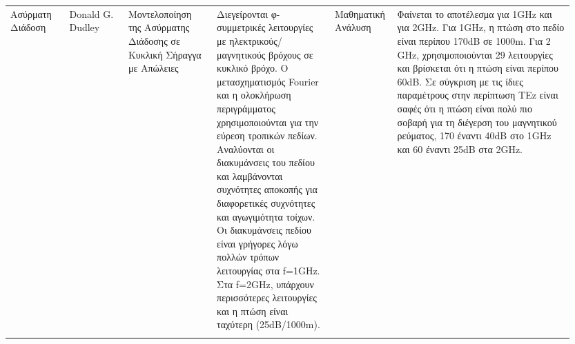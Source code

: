 \begin{landscape}
\begin{longtable}{p{0.1\linewidth}p{0.1\linewidth}p{0.15\linewidth}p{0.20\linewidth}p{0.1\linewidth}p{0.3\linewidth}}
        Ασύρματη Διάδοση & Donald G. Dudley \cite{dudley_wireless_2005} & Μοντελοποίηση της Ασύρματης Διάδοσης 
        σε Κυκλική Σήραγγα με Απώλειες &
        Διεγείρονται φ-συμμετρικές λειτουργίες με ηλεκτρικούς/μαγνητικούς βρόχους σε κυκλικό βρόχο. Ο μετασχηματισμός
        Fourier και η ολοκλήρωση περιγράμματος χρησιμοποιούνται για την εύρεση τροπικών πεδίων. Αναλύονται οι 
        διακυμάνσεις του πεδίου και λαμβάνονται συχνότητες αποκοπής για διαφορετικές συχνότητες και αγωγιμότητα τοίχων. 
        Οι διακυμάνσεις πεδίου είναι γρήγορες λόγω πολλών τρόπων λειτουργίας στα f=1GHz. Στα f=2GHz, υπάρχουν 
        περισσότερες λειτουργίες και η πτώση είναι ταχύτερη (25dB/1000m).& Μαθηματική Ανάλυση &
        Φαίνεται το αποτέλεσμα για 1GHz και για 2GHz. Για 1GHz, η πτώση στο πεδίο είναι περίπου 
        170dB σε 1000m. Για 2 GHz, χρησιμοποιούνται 29 λειτουργίες και βρίσκεται ότι η πτώση είναι 
        περίπου 60dB. Σε σύγκριση με τις ίδιες παραμέτρους στην περίπτωση ΤΕz είναι σαφές ότι η 
        πτώση είναι πολύ πιο σοβαρή για τη διέγερση του μαγνητικού ρεύματος, 170 έναντι 40dB στο 
        1GHz και 60 έναντι 25dB στα 2GHz.\\
        &&&&&\\
    \end{longtable}
\end{landscape}
